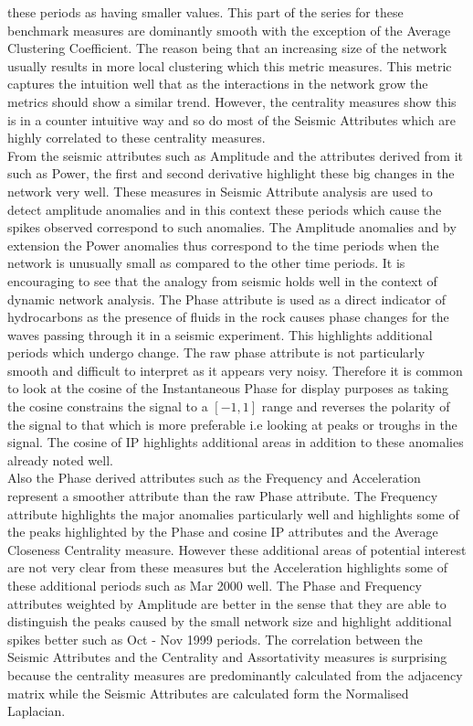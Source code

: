 these periods as having smaller values. This part of the series for these benchmark measures are dominantly smooth with the exception of the Average Clustering Coefficient. The reason being that an increasing size of the network usually results in more local clustering which this metric measures. This metric captures the intuition well that as the interactions in the network grow the metrics should show a similar trend. However, the centrality measures show this is in a counter intuitive way and so do most of the Seismic Attributes which are highly correlated to these centrality measures. \\

From the seismic attributes such as Amplitude and the attributes derived from it such as Power, the first and second derivative highlight these big changes in the network very well. These measures in Seismic Attribute analysis are used to detect amplitude anomalies and in this context these periods which cause the spikes observed correspond to such anomalies. The Amplitude anomalies and by extension the Power anomalies thus correspond to the time periods when the network is unusually small as compared to the other time periods. It is encouraging to see that the analogy from seismic holds well in the context of dynamic network analysis. The Phase attribute is used as a direct indicator of hydrocarbons as the presence of fluids in the rock causes phase changes for the waves passing through it in a seismic experiment. This highlights additional periods which undergo change. The raw phase attribute is not particularly smooth and difficult to interpret as it appears very noisy. Therefore it is common to look at the cosine of the Instantaneous Phase for display purposes as taking the cosine constrains the signal to a $[-1,1]$ range and reverses the polarity of the signal to that which is more preferable i.e looking at peaks or troughs in the signal. The cosine of IP highlights additional areas in addition to these anomalies already noted well. \\

Also the Phase derived attributes such as the Frequency and Acceleration represent a smoother attribute than the raw Phase attribute. The Frequency attribute highlights the major anomalies particularly well and highlights some of the peaks highlighted by the Phase and cosine IP attributes and the Average Closeness Centrality measure. However these additional areas of potential interest are not very clear from these measures but the Acceleration highlights some of these additional periods such as Mar 2000 well. The Phase and Frequency attributes weighted by Amplitude are better in the sense that they are able to distinguish the peaks caused by the small network size and highlight additional spikes better such as Oct - Nov 1999 periods. The correlation between the Seismic Attributes and the Centrality and Assortativity measures is surprising because the centrality measures are predominantly calculated from the adjacency matrix while the Seismic Attributes are calculated form the Normalised Laplacian. \\

